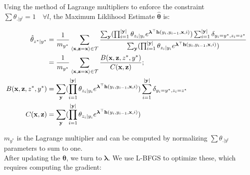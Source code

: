 \documentclass[11pt,onecolumn]{article}
\begin{document}
Using the method of Lagrange multipliers to enforce the constraint $\sum \theta_{.|y^l} = 1 \quad \forall l$, the Maximum Liklihood Estimate $\hat{\boldsymbol{\theta}}$ is:

\begin{align}
\hat{\theta}_{z^*|y^*} &= \frac{1}{m_{y^*}} \sum_{\langle\mathbf{x},\mathbf{z}=\mathbf{x}\rangle \in \cal{T}} \frac{\sum_{\mathbf{y}} (\prod_{i=1}^{|\mathbf{y}|} \theta_{z_i\mid y_i} e^{\boldsymbol{\lambda}^\top \mathbf{h}(y_i, y_{i-1}, \mathbf{x}, i)}) \sum_{i=1}^{|\mathbf{y}|}\delta_{y_i=y^*,z_i=z^*} }{\sum_{\mathbf{y}} (\prod_{i=1}^{|\mathbf{y}|} \theta_{z_i\mid y_i} e^{ \boldsymbol{\lambda}^\top \mathbf{h}(y_i, y_{i-1}, \mathbf{x}, i)}) } \\
&= \frac{1}{m_{y^*}} \sum_{\langle\mathbf{x},\mathbf{z}=\mathbf{x}\rangle \in \cal{T}} \frac{B(\mathbf{x}, \mathbf{z}, z^*, y^*)}{C(\mathbf{x}, \mathbf{z})}; \\
B(\mathbf{x}, \mathbf{z}, z^*, y^*) &= \sum_{\mathbf{y}} (\prod_{i=1}^{|\mathbf{y}|} \theta_{z_i\mid y_i} e^{\boldsymbol{\lambda}^\top \mathbf{h}(y_i, y_{i-1}, \mathbf{x}, i)}) \sum_{i=1}^{|\mathbf{y}|}\delta_{y_i=y^*,z_i=z^*}  \\
C(\mathbf{x}, \mathbf{z}) &= \sum_{\mathbf{y}} (\prod_{i=1}^{|\mathbf{y}|} \theta_{z_i\mid y_i} e^{ \boldsymbol{\lambda}^\top \mathbf{h}(y_i, y_{i-1}, \mathbf{x}, i)})
\end{align}

$m_{y^*}$ is the Lagrange multiplier and can be computed by normalizing $\sum \theta_{.|y^l}$ parameters to sum to one.\\

After updating the $\boldsymbol{\theta}$, we turn to $\boldsymbol{\lambda}$. We use L-BFGS to optimize these, which requires computing the gradient:
\end{document}
